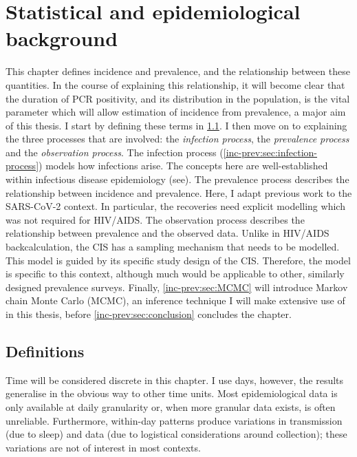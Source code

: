 \documentclass[thesis.tex]{subfiles}
\begin{document}
\ifSubfilesClassLoaded{
  \setcounter{chapter}{2}
}

\chapter{Statistical and epidemiological background} \label{inc-prev}


This chapter defines incidence and prevalence, and the relationship between these quantities.
In the course of explaining this relationship, it will become clear that the duration of PCR positivity, and its distribution in the population, is the vital parameter which will allow estimation of incidence from prevalence, a major aim of this thesis.
I start by defining these terms in \cref{inc-prev:sec:definitions}.
I then move on to explaining the three processes that are involved: the \emph{infection process}, the \emph{prevalence process} and the \emph{observation process}.
The infection process (\cref{inc-prev:sec:infection-process}) models how infections arise.
The concepts here are well-established within infectious disease epidemiology (see).
The prevalence process describes the relationship between incidence and prevalence.
Here, I adapt previous work to the SARS-CoV-2 context.
In particular, the recoveries need explicit modelling which was not required for HIV/AIDS.
The observation process describes the relationship between prevalence and the observed data.
Unlike in HIV/AIDS backcalculation, the CIS has a sampling mechanism that needs to be modelled.
This model is guided by its specific study design of the CIS.
Therefore, the model is specific to this context, although much would be applicable to other, similarly designed prevalence surveys.
Finally, \cref{inc-prev:sec:MCMC} will introduce Markov chain Monte Carlo (MCMC), an inference technique I will make extensive use of in this thesis, before \cref{inc-prev:sec:conclusion} concludes the chapter.

\section{Definitions} \label{inc-prev:sec:definitions}

Time will be considered discrete in this chapter.
I use days, however, the results generalise in the obvious way to other time units.
Most epidemiological data is only available at daily granularity or, when more granular data exists, is often unreliable.
Furthermore, within-day patterns produce variations in transmission (\eg due to sleep) and data (\eg due to logistical considerations around collection); these variations are not of interest in most contexts.
\end{document}
